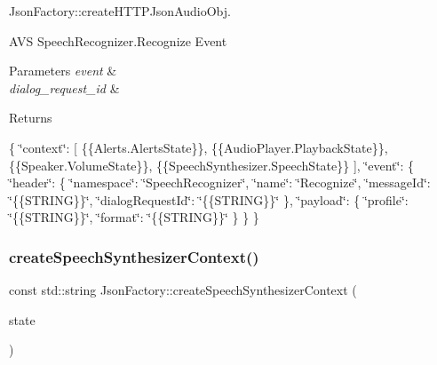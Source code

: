Json\+Factory\+::create\+H\+T\+T\+P\+Json\+Audio\+Obj. 

A\+VS Speech\+Recognizer.\+Recognize Event 
\begin{DoxyParams}{Parameters}
{\em event} & \\
\hline
{\em dialog\+\_\+request\+\_\+id} & \\
\hline
\end{DoxyParams}
\begin{DoxyReturn}{Returns}

\end{DoxyReturn}
\{ \char`\"{}context\char`\"{}\+: \mbox{[} \{\{Alerts.\+Alerts\+State\}\}, \{\{Audio\+Player.\+Playback\+State\}\}, \{\{Speaker.\+Volume\+State\}\}, \{\{Speech\+Synthesizer.\+Speech\+State\}\} \mbox{]}, \char`\"{}event\char`\"{}\+: \{ \char`\"{}header\char`\"{}\+: \{ \char`\"{}namespace\char`\"{}\+: \char`\"{}\+Speech\+Recognizer\char`\"{}, \char`\"{}name\char`\"{}\+: \char`\"{}\+Recognize\char`\"{}, \char`\"{}message\+Id\char`\"{}\+: \char`\"{}\{\{\+S\+T\+R\+I\+N\+G\}\}\char`\"{}, \char`\"{}dialog\+Request\+Id\char`\"{}\+: \char`\"{}\{\{\+S\+T\+R\+I\+N\+G\}\}\char`\"{} \}, \char`\"{}payload\char`\"{}\+: \{ \char`\"{}profile\char`\"{}\+: \char`\"{}\{\{\+S\+T\+R\+I\+N\+G\}\}\char`\"{}, \char`\"{}format\char`\"{}\+: \char`\"{}\{\{\+S\+T\+R\+I\+N\+G\}\}\char`\"{} \} \} \} \mbox{\label{classAVSJson_1_1JsonFactory_ab83af75c1e25cf954843b823c9eefa93}} 
\subsubsection{\texorpdfstring{create\+Speech\+Synthesizer\+Context()}{createSpeechSynthesizerContext()}}
{\footnotesize\ttfamily const std\+::string Json\+Factory\+::create\+Speech\+Synthesizer\+Context (\begin{DoxyParamCaption}\item[{const \hyperlink{structAVSJson_1_1SpeechState}{Speech\+State} $\ast$}]{state }\end{DoxyParamCaption})\hspace{0.3cm}{\ttfamily [protected]}}



